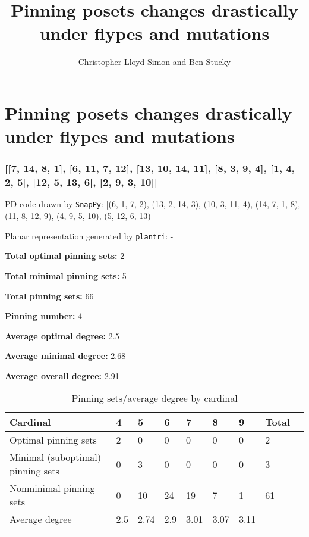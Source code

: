 \documentclass{article}%
\title{Pinning posets changes drastically under flypes and mutations}
\author{Christopher-Lloyd Simon and Ben Stucky}
\begin{document}
%

\section{Pinning posets changes drastically under flypes and mutations}

\subsubsection{[[7, 14, 8, 1], [6, 11, 7, 12], [13, 10, 14, 11], [8, 3, 9, 4], [1, 4, 2, 5], [12, 5, 13, 6], [2, 9, 3, 10]]}

{\small\noindent PD code drawn by \texttt{SnapPy}: [(6, 1, 7, 2), (13, 2, 14, 3), (10, 3, 11, 4), (14, 7, 1, 8), (11, 8, 12, 9), (4, 9, 5, 10), (5, 12, 6, 13)]}

{\small\noindent Planar representation generated by \texttt{plantri}: -}

\begin{multicols}{2}
{\normalsize \noindent\textbf{Total optimal pinning sets:} 2

\noindent\textbf{Total minimal pinning sets:} 5

\noindent\textbf{Total pinning sets:} 66

\noindent\textbf{Pinning number:} 4

}
\columnbreak

{\normalsize \noindent\textbf{Average optimal degree:} 2.5

\noindent\textbf{Average minimal degree:} 2.68

\noindent\textbf{Average overall degree:} 2.91

}
\end{multicols}

\begin{table}[ht]
	\caption{Pinning sets/average degree by cardinal}
	\centering
	\renewcommand{\arraystretch}{1.5}
	\begin{tabularx}{\textwidth}{lXXXXXXXX}
		\toprule
			Cardinal & 4 & 5 & 6 & 7 & 8 & 9 & Total\\
			\hline
			Optimal pinning sets & 2 & 0 & 0 & 0 & 0 & 0 & 2 \\
			Minimal (suboptimal) pinning sets & 0 & 3 & 0 & 0 & 0 & 0 & 3 \\
			Nonminimal pinning sets & 0 & 10 & 24 & 19 & 7 & 1 & 61 \\
			Average degree & 2.5 & 2.74 & 2.9 & 3.01 & 3.07 & 3.11 &  \\
		\bottomrule \\ 
	\end{tabularx}
\end{table}
\end{document}
